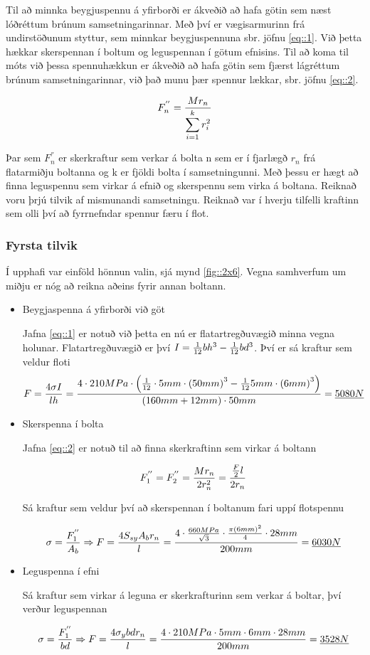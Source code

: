 Til að minnka beygjuspennu á yfirborði er ákveðið að hafa götin sem næst lóðréttum brúnum samsetningarinnar. Með því er vægisarmurinn frá undirstöðunum styttur, sem minnkar beygjuspennuna sbr. jöfnu \ref{eq::1}. Við þetta hækkar skerspennan í boltum og leguspennan í götum efnisins. Til að koma til móts við þessa spennuhækkun er ákveðið að hafa götin sem fjærst lágréttum brúnum samsetningarinnar, við það munu þær spennur lækkar, sbr. jöfnu \ref{eq::2}\cite{shigleys}.

\begin{equation}
	F_n^{''} = {M r_n \over \displaystyle\sum_{i=1}^{k} r_i^2}
	\label{eq::2}
\end{equation}

Þar sem $F_n^{''}$ er skerkraftur sem verkar á bolta n sem er í fjarlægð $r_n$ frá flatarmiðju boltanna og k er fjöldi bolta í samsetningunni. Með þessu er hægt að finna leguspennu sem virkar á efnið og skerspennu sem virka á boltana. Reiknað voru þrjú tilvik af mismunandi samsetningu. Reiknað var í hverju tilfelli kraftinn sem olli því að fyrrnefndar spennur færu í flot.

\subsubsection{Fyrsta tilvik}

Í upphafi var einföld hönnun valin, sjá mynd \ref{fig::2x6}. Vegna samhverfum um miðju er nóg að reikna aðeins fyrir annan boltann.

\begin{itemize}
	\item Beygjaspenna á yfirborði við göt
	
Jafna \ref{eq::1} er notuð við þetta en nú er flatartregðuvægið minna vegna holunar. Flatartregðuvægið er því $I = {1 \over 12}bh^3 - {1 \over 12}bd^3$. Því er sá kraftur sem veldur floti
\[
F = \frac{4 \sigma I}{l h} = {4 \cdot 210 MPa \cdot  \left({1 \over 12} \cdot 5 mm \cdot \left(50mm\right)^3 - {1 \over 12} 5 mm \cdot \left(6mm\right)^3\right) \over (160 mm + 12 mm) \cdot 50 mm} = \underline{5080N}
\] 

	\item Skerspenna í bolta

Jafna \ref{eq::2} er notuð til að finna skerkraftinn sem virkar á boltann

\[
F_1^{''} = F_2^{''} = {Mr_n \over 2r_n^2} = {{F \over 2}l \over 2 r_n} 
\]

Sá kraftur sem veldur því að skerspennan í boltanum fari uppí flotspennu

\[
\sigma = {F_1^{''} \over A_b} \Rightarrow F = {4 S_{sy} A_b r_n \over l} = {4 \cdot {660MPa \over \sqrt{3}} \cdot {\pi \left(6mm\right)^2 \over 4} \cdot 28 mm \over 200 mm} = \underline{6030N}
\]

	\item Leguspenna í efni
	
	Sá kraftur sem virkar á leguna er skerkrafturinn sem verkar á boltar, því verður leguspennan
	
\[
\sigma = {F_1^{''} \over bd} \Rightarrow F = {4 \sigma_{y} b d r_n \over l} = {4 \cdot 210 MPa \cdot 5 mm \cdot 6 mm \cdot 28 mm \over 200mm} = \underline{3528N}
\]
\end{itemize}

